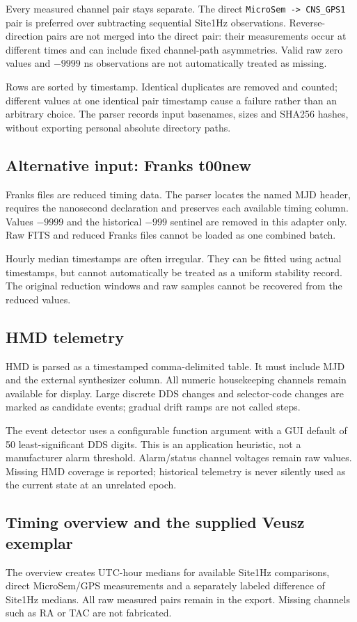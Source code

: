 \documentclass[11pt,a4paper]{article}
\begin{document}
Every measured channel pair stays separate. The direct
\texttt{MicroSem -> CNS\_GPS1} pair is preferred over subtracting sequential
Site1Hz observations. Reverse-direction pairs are not merged into the direct
pair: their measurements occur at different times and can include fixed
channel-path asymmetries. Valid raw zero values and \(-9999\) ns observations
are not automatically treated as missing.

Rows are sorted by timestamp. Identical duplicates are removed and counted;
different values at one identical pair timestamp cause a failure rather than
an arbitrary choice. The parser records input basenames, sizes and SHA256
hashes, without exporting personal absolute directory paths.

\subsection{Alternative input: Franks t00new}
Franks files are reduced timing data. The parser locates the named MJD header,
requires the nanosecond declaration and preserves each available timing column.
Values \(-9999\) and the historical \(-999\) sentinel are removed in this adapter
only. Raw FITS and reduced Franks files cannot be loaded as one combined batch.

Hourly median timestamps are often irregular. They can be fitted using actual
timestamps, but cannot automatically be treated as a uniform stability record.
The original reduction windows and raw samples cannot be recovered from the
reduced values.

\subsection{HMD telemetry}
HMD is parsed as a timestamped comma-delimited table. It must include MJD and
the external synthesizer column. All numeric housekeeping channels remain
available for display. Large discrete DDS changes and selector-code changes
are marked as candidate events; gradual drift ramps are not called steps.

The event detector uses a configurable function argument with a GUI default
of 50 least-significant DDS digits. This is an application heuristic, not a
manufacturer alarm threshold. Alarm/status channel voltages remain raw
values. Missing HMD coverage is reported; historical telemetry is never silently
used as the current state at an unrelated epoch.

\subsection{Timing overview and the supplied Veusz exemplar}
The overview creates UTC-hour medians for available Site1Hz comparisons,
direct MicroSem/GPS measurements and a separately labeled difference of
Site1Hz medians. All raw measured pairs remain in the export. Missing channels
such as RA or TAC are not fabricated.
\end{document}
